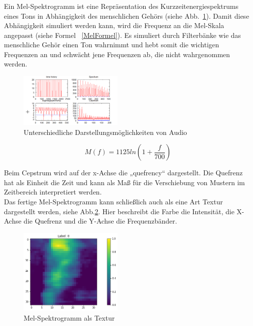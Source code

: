 \documentclass[sigconf]{acmart}
\begin{document}
\subsubsection{}
Ein Mel-Spektrogramm ist eine Repräsentation des Kurzzeitenergiespektrums eines Tons in Abhängigkeit des menschlichen Gehörs (siehe Abb.~\ref{fig:MelSpektrogramm}). Damit diese Abhängigkeit simuliert werden kann, wird die Frequenz an die Mel-Skala\cite{ganchev2005comparative} angepasst (siehe Formel ~\ref{MelFormel}). Es simuliert durch Filterbänke wie das menschliche Gehör einen Ton wahrnimmt und hebt somit die wichtigen Frequenzen an und schwächt jene Frequenzen ab, die nicht wahrgenommen werden. 
\begin{figure}[ht]
  \includegraphics[width=0.45\textwidth]{images/melexplanation}
  \caption{Unterschiedliche Darstellungsmöglichkeiten von Audio}
  \Description{}
  \label{fig:MelSpektrogramm}
\end{figure}

\newpage
\begin{equation}\label{MelFormel}
M(f)=1125ln(1+\frac{f}{700})
\end{equation}

\noindent Beim Cepstrum wird auf der x-Achse die „quefrency“ dargestellt. Die Quefrenz hat als Einheit die Zeit und kann als Maß für die Verschiebung von Mustern im Zeitbereich interpretiert werden.\\
\noindent Das fertige Mel-Spektrogramm kann schließlich auch als eine Art Textur dargestellt werden, siehe Abb.\ref{fig:MelTextur}.  
Hier beschreibt die Farbe die Intensität, die X-Achse die Quefrenz und die Y-Achse die Frequenzbänder. 
\begin{figure}[ht]
  \includegraphics[width=0.45\textwidth]{images/Mel}
  \caption{Mel-Spektrogramm als Textur}
  \Description{}
  \label{fig:MelTextur}
\end{figure}
\end{document}
